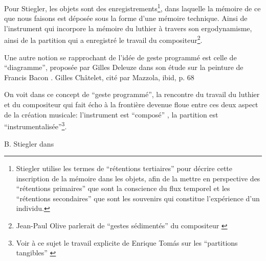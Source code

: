 Pour Stiegler, les objets sont des enregistrements\footnote{Stiegler utilise les termes de ``rétentions tertiaires'' pour décrire cette inscription de la mémoire dans les objets, afin de la mettre en perspective des ``rétentions primaires'' que sont la conscience du flux temporel et les ``rétentions secondaires'' que sont les souvenirs qui constitue l'expérience d'un individu.}, dans laquelle la mémoire de ce que nous faisons est déposée sous la forme d'une mémoire technique. Ainsi de l'instrument qui incorpore la mémoire du luthier à travers son ergodynamisme, ainsi de la partition qui a enregistré le travail du compositeur\footnote{Jean-Paul Olive parlerait de ``gestes sédimentés'' du compositeur \cite{olive_expression_2013}}.

Une autre notion se rapprochant de l'idée de geste programmé est celle de ``diagramme'', proposée par Gilles Deleuze dans son étude sur la peinture de Francis Bacon \cite{deleuze_francis_2002}.
 Gilles Châtelet, cité par Mazzola, ibid, p. 68


On voit dans ce concept de ``geste programmé'', la rencontre du travail du luthier et du compositeur qui fait écho à la frontière devenue floue entre ces deux aspect de la création musicale: l'instrument est ``composé'' \cite{schnell_introducing_2002}, la partition est ``instrumentalisée''\footnote{Voir à ce sujet le travail explicite de Enrique Tomás sur les ``partitions tangibles'' \cite{tomas_tangible_2014}}.

\cite{dobrian_e_2006}


 B. Stiegler dans \cite{stiegler_circuit_2004}

